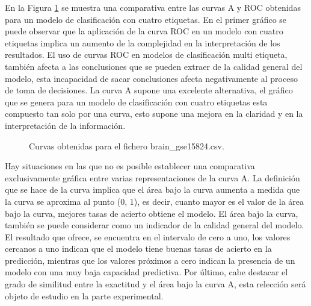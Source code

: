 \bigbreak

En la Figura \ref{fig:2} se muestra una comparativa entre las curvas A y ROC obtenidas para un modelo de clasificación con cuatro etiquetas. En el primer gráfico se puede observar que la aplicación de la curva ROC en un modelo con cuatro etiquetas implica un aumento de la complejidad en la interpretación de los resultados. El uso de curvas ROC en modelos de clasificación multi etiqueta, también afecta a las conclusiones que se pueden extraer de la calidad general del modelo, esta incapacidad de sacar conclusiones afecta negativamente al proceso de toma de decisiones. La curva A supone una excelente alternativa, el gráfico que se genera para un modelo de clasificación con cuatro etiquetas esta compuesto tan solo por una curva, esto supone una mejora en la claridad y en la interpretación de la información. 

\bigbreak

\begin{figure}[htp]
    \centering
    \caption{Curvas obtenidas para el fichero brain\_gse15824.csv.}
    \label{fig:2}
\end{figure}

\bigbreak


Hay situaciones en las que no es posible establecer una comparativa exclusivamente gráfica entre varias representaciones de la curva A. La definición que se hace de la curva implica que el área bajo la curva aumenta a medida que la curva se aproxima al punto (0, 1), es decir, cuanto mayor es el valor de la área bajo la curva, mejores tasas de acierto obtiene el modelo. El área bajo la curva, también se puede considerar como un indicador de la calidad general del modelo. El resultado que ofrece, se encuentra en el intervalo de cero a uno, los valores cercanos a uno indican que el modelo tiene buenas tasas de acierto en la predicción, mientras que los valores próximos a cero indican la presencia de un modelo con una muy baja capacidad predictiva. Por último, cabe destacar el grado de similitud entre la exactitud y el área bajo la curva A, esta relección será objeto de estudio en la parte experimental.

\clearpage